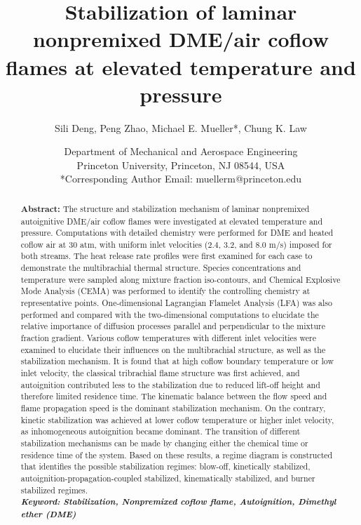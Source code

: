 \documentclass{wssci}
\begin{document}
\title{Stabilization of laminar nonpremixed DME/air coflow flames at elevated temperature and pressure}

\author{
%
Sili Deng, Peng Zhao, Michael E. Mueller*, Chung K. Law 
%
}
\date{
Department of Mechanical and Aerospace Engineering\\
Princeton University, Princeton, NJ 08544, USA\\
*Corresponding Author Email: muellerm@princeton.edu
%
}

\maketitle
\thispagestyle{fancyplain}

\begin{abstract}
\textbf{Abstract:} The structure and stabilization mechanism of laminar nonpremixed autoignitive DME/air coflow flames were investigated at elevated temperature and pressure. Computations with detailed chemistry were performed for DME and heated coflow air at $30$ atm, with uniform inlet velocities ($2.4$, $3.2$, and $8.0$ m/s) imposed for both streams.  The heat release rate profiles were first examined for each case to demonstrate the multibrachial thermal structure.  Species concentrations and temperature were sampled along mixture fraction iso-contours, and Chemical Explosive Mode Analysis (CEMA) was performed to identify the controlling chemistry at representative points.  One-dimensional Lagrangian Flamelet Analysis (LFA) was also performed and compared with the two-dimensional computations to elucidate the relative importance of diffusion processes parallel and perpendicular to the mixture fraction gradient.  Various coflow temperatures with different inlet velocities were examined to elucidate their influences on the multibrachial structure, as well as the stabilization mechanism.  It is found that at high coflow boundary temperature or low inlet velocity, the classical tribrachial flame structure was first achieved, and autoignition contributed less to the stabilization due to reduced lift-off height and therefore limited residence time.  The kinematic balance between the flow speed and flame propagation speed is the dominant stabilization mechanism.  On the contrary, kinetic stabilization was achieved at lower coflow temperature or higher inlet velocity, as inhomogeneous autoignition became dominant.  The transition of different stabilization mechanisms can be made by changing either the chemical time or residence time of the system.  Based on these results, a regime diagram is constructed that identifies the possible stabilization regimes: blow-off, kinetically stabilized, autoignition-propagation-coupled stabilized, kinematically stabilized, and burner stabilized regimes.\\
\textbf{\textit{Keyword: Stabilization, Nonpremixed coflow flame, Autoignition, Dimethyl ether (DME)}}
\end{abstract}
\end{document}

